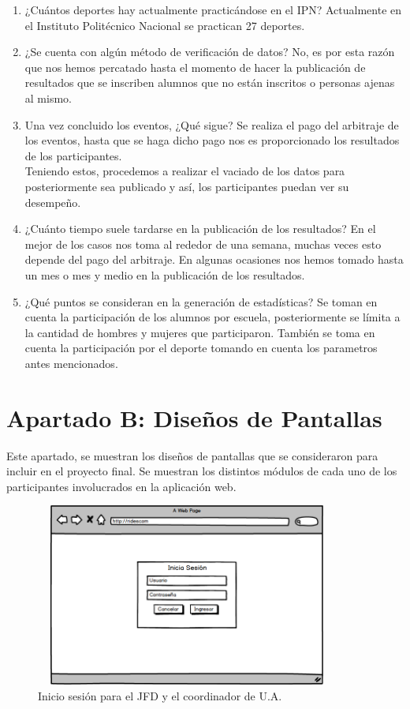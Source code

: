 \begin{enumerate}
		\item ¿Cuántos deportes hay actualmente practicándose en el IPN?
		Actualmente en el Instituto Politécnico Nacional se practican 27 deportes.
		
		\item ¿Se cuenta con algún método de verificación de datos?
		No, es por esta razón que nos hemos percatado hasta el momento de hacer la publicación de resultados que se inscriben alumnos que no están inscritos o personas ajenas al mismo.
		
		\item Una vez concluido los eventos, ¿Qué sigue?
		Se realiza el pago del arbitraje de los eventos, hasta que se haga dicho pago nos es proporcionado los resultados de los participantes.\\
		Teniendo estos, procedemos a realizar el vaciado de los datos para posteriormente sea publicado y así, los participantes puedan ver su desempeño.
		
		\item ¿Cuánto tiempo suele tardarse en la publicación de los resultados?
		En el mejor de los casos nos toma al rededor de una semana, muchas veces esto depende del pago del arbitraje. En algunas ocasiones nos hemos tomado hasta un mes o mes y medio en la publicación de los resultados. 
		
		\item ¿Qué puntos se consideran en la generación de estadísticas?
		Se toman en cuenta la participación de los alumnos por escuela, posteriormente se límita a la cantidad de hombres y mujeres que participaron. También se toma en cuenta la participación por el deporte tomando en cuenta los parametros antes mencionados.
		
	\end{enumerate} 
		
	\chapter{Apartado B: Diseños de Pantallas}
	\label{diseños}
	\noindent Este apartado, se muestran los diseños de pantallas que se consideraron para incluir en el proyecto final. Se muestran los distintos módulos de cada uno de los participantes involucrados en la aplicación web.
	
		\begin{figure}[hbt!]
			\centering
			\includegraphics[width=10cm, height=6cm]{Imagenes/Nuevos/P1_LoginJFD_coord}
			\caption{Inicio sesión para el JFD y el coordinador de U.A.}
			\label{inicioJFDycoord}
		\end{figure}
		\pagebreak
		

